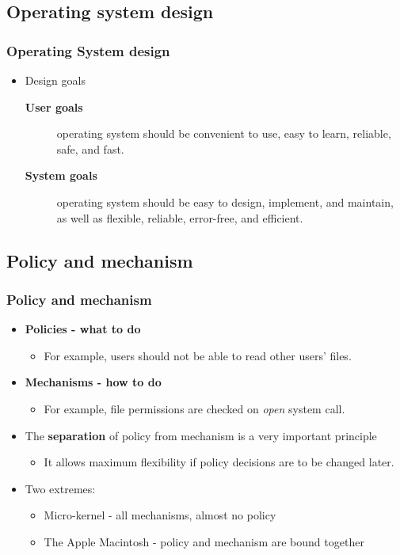 \documentclass[CJKutf8,xcolor=pdftex,dvipsnames,table]{beamer}
\begin{document}
\begin{CJK*}{UTF8}{song}
  \section{Operating system design}
  
  \begin{frame}
    \frametitle{Operating System design} \pause
    \begin{itemize}
    \item{Design goals} \pause
      \begin{description}
      \item[\textbf{User goals}]{operating system should be convenient to use, easy to learn, reliable, safe, and fast.} \pause
      \item[\textbf{System goals}]{operating system should be easy to design, implement, and maintain, as well as flexible, reliable, error-free, and efficient.}
      \end{description}
    \end{itemize}
  \end{frame}
  
  \subsection{Policy and mechanism}

  \begin{frame}
    \frametitle{Policy and mechanism} \pause
    \begin{itemize}
    \item{\textbf{Policies \pause - what to do}} \pause
      \begin{itemize}
      \item{For example, users should not be able to read other users' files.} \pause
      \end{itemize}
    \item{\textbf{Mechanisms \pause - how to do}} \pause
      \begin{itemize}
      \item{For example, file permissions are checked on \emph{open} system call.} \pause
      \end{itemize}
    \item{The \textbf{separation} of policy from mechanism is a very important principle} \pause
      \begin{itemize}
      \item{It allows maximum flexibility if policy decisions are to be changed later.} \pause
      \end{itemize}
    \item{Two extremes:} \pause
      \begin{itemize}
      \item{Micro-kernel \pause - all mechanisms, almost no policy} \pause
      \item{The Apple Macintosh \pause - policy and mechanism are bound together}
      \end{itemize}
    \end{itemize}
  \end{frame}


\end{CJK*}
\end{document}

